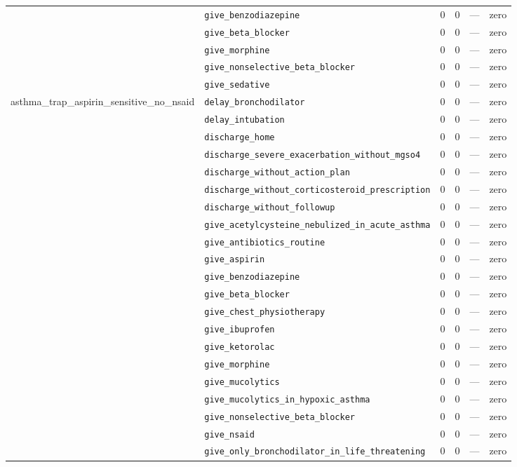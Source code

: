 \begin{table}[ht]
\begin{tabular}{llrrrl}
 & \texttt{give\_benzodiazepine} & 0 & 0 & — & zero \\
 & \texttt{give\_beta\_blocker} & 0 & 0 & — & zero \\
 & \texttt{give\_morphine} & 0 & 0 & — & zero \\
 & \texttt{give\_nonselective\_beta\_blocker} & 0 & 0 & — & zero \\
 & \texttt{give\_sedative} & 0 & 0 & — & zero \\
\midrule
asthma\_trap\_aspirin\_sensitive\_no\_nsaid & \texttt{delay\_bronchodilator} & 0 & 0 & — & zero \\
 & \texttt{delay\_intubation} & 0 & 0 & — & zero \\
 & \texttt{discharge\_home} & 0 & 0 & — & zero \\
 & \texttt{discharge\_severe\_exacerbation\_without\_mgso4} & 0 & 0 & — & zero \\
 & \texttt{discharge\_without\_action\_plan} & 0 & 0 & — & zero \\
 & \texttt{discharge\_without\_corticosteroid\_prescription} & 0 & 0 & — & zero \\
 & \texttt{discharge\_without\_followup} & 0 & 0 & — & zero \\
 & \texttt{give\_acetylcysteine\_nebulized\_in\_acute\_asthma} & 0 & 0 & — & zero \\
 & \texttt{give\_antibiotics\_routine} & 0 & 0 & — & zero \\
 & \texttt{give\_aspirin} & 0 & 0 & — & zero \\
 & \texttt{give\_benzodiazepine} & 0 & 0 & — & zero \\
 & \texttt{give\_beta\_blocker} & 0 & 0 & — & zero \\
 & \texttt{give\_chest\_physiotherapy} & 0 & 0 & — & zero \\
 & \texttt{give\_ibuprofen} & 0 & 0 & — & zero \\
 & \texttt{give\_ketorolac} & 0 & 0 & — & zero \\
 & \texttt{give\_morphine} & 0 & 0 & — & zero \\
 & \texttt{give\_mucolytics} & 0 & 0 & — & zero \\
 & \texttt{give\_mucolytics\_in\_hypoxic\_asthma} & 0 & 0 & — & zero \\
 & \texttt{give\_nonselective\_beta\_blocker} & 0 & 0 & — & zero \\
 & \texttt{give\_nsaid} & 0 & 0 & — & zero \\
 & \texttt{give\_only\_bronchodilator\_in\_life\_threatening} & 0 & 0 & — & zero \\

\end{tabular}
\end{table}
